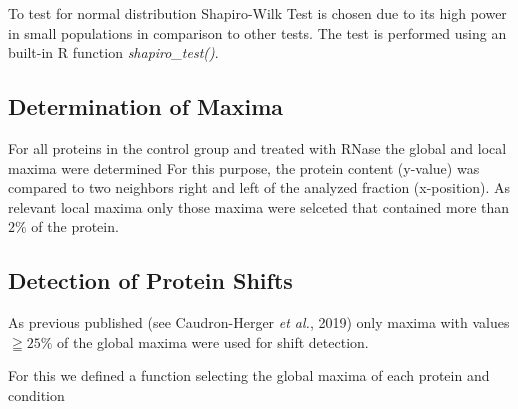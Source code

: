 \documentclass[
]{article}
\begin{document}
To test for normal distribution Shapiro-Wilk Test is chosen due to its
high power in small populations in comparison to other tests. The test
is performed using an built-in R function \emph{shapiro\_test()}.

\hypertarget{determination-of-maxima}{%
\subsection{Determination of Maxima}\label{determination-of-maxima}}

For all proteins in the control group and treated with RNase the global
and local maxima were determined For this purpose, the protein content
(y-value) was compared to two neighbors right and left of the analyzed
fraction (x-position). As relevant local maxima only those maxima were
selceted that contained more than \(2\%\) of the protein.

\hypertarget{detection-of-protein-shifts}{%
\subsection{Detection of Protein
Shifts}\label{detection-of-protein-shifts}}

As previous published (see Caudron-Herger \emph{et al.}, 2019) only
maxima with values \(\geqq 25\%\) of the global maxima were used for
shift detection.

For this we defined a function selecting the global maxima of each
protein and condition
\end{document}
